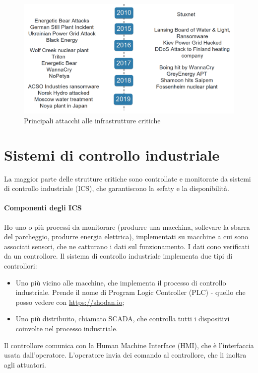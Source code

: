 \begin{figure}
    \centering
    \includegraphics[width=1\textwidth]{images/6.png}
    \caption{Principali attacchi alle infrastrutture critiche}
    \label{fig:my_label4}
\end{figure}

\section{Sistemi di controllo industriale}

La maggior parte delle strutture critiche sono controllate e monitorate da sistemi di controllo industriale (ICS), che garantiscono la sefaty e la disponibilità. 

\paragraph{Componenti degli ICS} Ho uno o più processi da monitorare (produrre una macchina, sollevare la sbarra del parcheggio, produrre energia elettrica), implementati su macchine a cui sono associati sensori, che ne catturano i dati sul funzionamento. I dati cono verificati da un controllore. Il sistema di controllo industriale implementa due tipi di controllori: 
\begin{itemize}
    \item Uno più vicino alle macchine, che implementa il processo di controllo industriale. Prende il nome di Program Logic Controller (PLC) - quello che posso vedere con \href{https://shodan.io}{https://shodan.io};
    \item Uno più distribuito, chiamato SCADA, che controlla tutti i dispositivi coinvolte nel processo industriale.
\end{itemize}

Il controllore comunica con la Human Machine Interface (HMI), che è l'interfaccia usata dall'operatore. L'operatore invia dei comando al controllore, che li inoltra agli attuatori.

